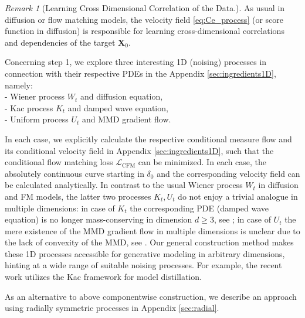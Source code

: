 \documentclass{article}
\theoremstyle{plain}
\theoremstyle{definition}
\theoremstyle{remark}
\newtheorem{remark}[theorem]{Remark}
\begin{document}
\begin{remark}[Learning Cross Dimensional Correlation of the Data.]
    As usual in diffusion or flow matching models, the {velocity field} \eqref{eq:Ce_process} (or score function in diffusion) is responsible for learning cross-dimensional correlations and dependencies of the target $\mathbf{X}_0$.
\end{remark}
%
Concerning step 1, we explore three interesting 1D (noising) processes in connection with their respective PDEs in the Appendix \ref{sec:ingredients1D}, namely:
\\[1ex]
- Wiener process $W_t$ and diffusion equation,
\\
- Kac process $K_t$ and damped wave equation,
\\
- Uniform process $U_t$ and  MMD gradient flow. 


In each case, we explicitly calculate the respective conditional measure flow and its conditional velocity field in Appendix \ref{sec:ingredients1D}, such that the conditional flow matching loss $\mathcal{L}_{\text{CFM}}$ can be minimized.
In each case, the absolutely continuous curve  starting in $\delta_0$ and the corresponding velocity field can be calculated analytically. 
In contrast to the usual Wiener process $W_t$  in diffusion and FM models, the latter two processes $K_t, U_t$ do not enjoy a trivial analogue in multiple dimensions: in case of $K_t$ the corresponding PDE (damped wave equation) is no longer mass-conserving in dimension $d \ge 3$, see \cite{TL2016}; in case of $U_t$ the mere existence of the MMD gradient flow in multiple dimensions is unclear due to the lack of convexity of the MMD, see \cite{HGBS2022}. Our general construction method makes these 1D processes accessible for generative modeling in arbitrary dimensions{, hinting at a wide range of suitable noising processes}. For example, the recent work \cite{han2025distillkacfewstepimagegeneration} utilizes the Kac framework for model distillation. 

As an alternative to above componentwise construction, we describe an approach using radially symmetric processes in Appendix \ref{sec:radial}.
\end{document}
